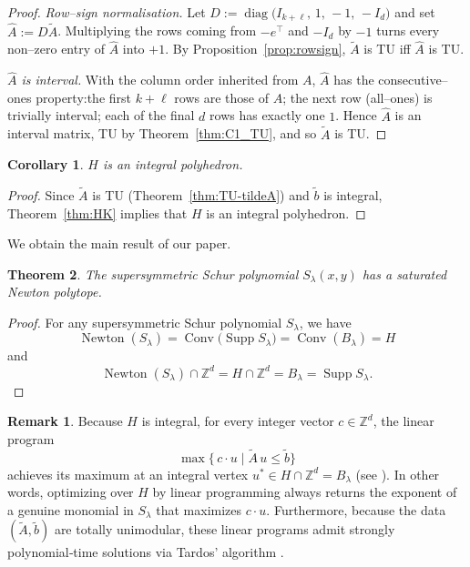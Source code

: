 \documentclass[12pt,a4paper,oneside]{amsart}
\newtheorem{theorem}{Theorem}[section]
\newtheorem {corollary}[theorem]{Corollary}
\theoremstyle{definition}
\newtheorem{remark}{Remark}[section]
\DeclareMathOperator{\Supp}{Supp}
\DeclareMathOperator{\Conv}{Conv}
\DeclareMathOperator{\Newton}{Newton}
\newcommand{\Z}{\mathbb{Z}}
\begin{document}
\begin{proof}
\emph{Row–sign normalisation.}
Let
$
  D:=\operatorname{diag}\bigl(I_{k+\ell},\,1,\,-1,\,-I_{d}\bigr)
$
and set $\widehat A:=D\widetilde A$.
Multiplying the rows coming from $-e^{\!\top}$ and $-I_d$ by $-1$ turns every non–zero entry of $\widehat A$ into $+1$. By Proposition~\ref{prop:rowsign}, $\widetilde A$ is TU iff $\widehat A$ is TU.

\emph{  $\widehat A$ is interval.}
With the column order inherited from $A$,
$\widehat A$ has the consecutive–ones property:the first $k+\ell$ rows are those of $A$; the next row (all–ones) is trivially interval; each of the final $d$ rows has exactly one $1$. Hence $\widehat A$ is an interval matrix, TU by
Theorem~\ref{thm:C1_TU}, and so $\widetilde A$ is TU.
\end{proof}

\begin{corollary}\label{thm:integral-H}
     $H$ is an integral polyhedron.
\end{corollary}
\begin{proof}
    Since $\widetilde A$ is TU (Theorem~\ref{thm:TU-tildeA}) and $\widetilde b$ is integral, Theorem~\ref{thm:HK} implies that $H$ is an integral polyhedron.
\end{proof}
 
We obtain the main result of our paper.
\begin{theorem}\label{Main}
The supersymmetric Schur polynomial $S_\lambda(x,y)$ has a saturated Newton polytope.
\end{theorem}

\begin{proof}
For any supersymmetric Schur polynomial $S_\lambda$, we have 
\[
   \Newton(S_\lambda)
        =\Conv\bigl(\Supp S_\lambda\bigr)
        =\Conv(B_\lambda)
        =H
        \]
and
\[
   \Newton(S_\lambda)\cap\Z^{d}
        =H\cap\Z^{d}
        =B_\lambda
        =\Supp S_\lambda.
\]

\end{proof}


\begin{remark}
Because $H$ is integral, for every integer vector $c\in\Z^d$, the linear program
\[
\max\{\,c\cdot u \mid \widetilde A\,u \le \widetilde b\}
\]
achieves its maximum at an integral vertex $u^*\in H\cap\Z^d = B_\lambda$ (see \cite{Sch03}).  In other words, optimizing over $H$ by linear programming always returns the exponent of a genuine monomial in $S_\lambda$ that maximizes $c\cdot u$.  Furthermore, because the data $(\widetilde A,\widetilde b)$ are totally unimodular, these linear programs admit strongly polynomial‑time solutions via Tardos’ algorithm \cite{Tar86}.

\end{remark}
\end{document}
